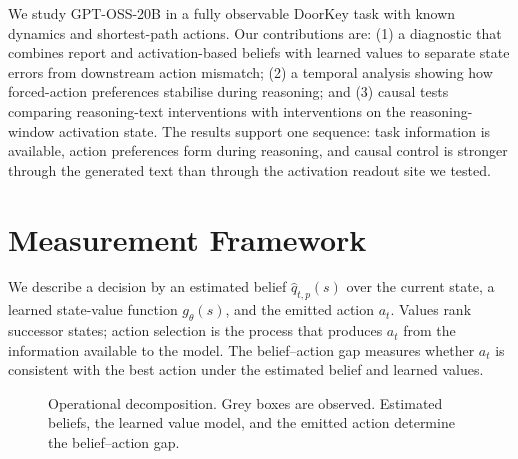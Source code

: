 \documentclass{article}
\begin{document}
We study GPT-OSS-20B in a fully observable DoorKey task with known dynamics and shortest-path actions. Our contributions are: (1) a diagnostic that combines report and activation-based beliefs with learned values to separate state errors from downstream action mismatch; (2) a temporal analysis showing how forced-action preferences stabilise during reasoning; and (3) causal tests comparing reasoning-text interventions with interventions on the reasoning-window activation state. The results support one sequence: task information is available, action preferences form during reasoning, and causal control is stronger through the generated text than through the activation readout site we tested.


\section{Measurement Framework}
\label{sec:estimating}

We describe a decision by an estimated belief $\hat q_{t,p}(s)$ over the current state, a learned state-value function $g_\theta(s)$, and the emitted action $a_t$. Values rank successor states; action selection is the process that produces $a_t$ from the information available to the model. The belief--action gap measures whether $a_t$ is consistent with the best action under the estimated belief and learned values.

\begin{figure}[t]
\centering
{}
\caption{Operational decomposition. Grey boxes are observed. Estimated beliefs, the learned value model, and the emitted action determine the belief--action gap.}
\label{fig:belief_action_pipeline}
\end{figure}
\end{document}
